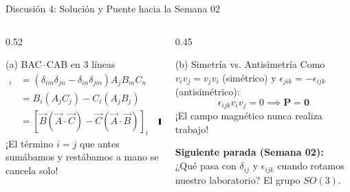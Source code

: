 \documentclass[10pt,aspectratio=169]{beamer}
\begin{document}
\begin{frame}{Discusión 4: Solución y Puente hacia la Semana 02}
  \begin{columns}[c]
    \begin{column}{0.52\textwidth}
      \begin{exampleblock}{(a) BAC--CAB en 3 líneas}
        \small
        \begin{align*}
          [\vec{A}\times(\vec{B}\times\vec{C})]_i &= (\delta_{im}\delta_{jn} - \delta_{in}\delta_{jm}) A_j B_m C_n \\
          &= B_i(A_j C_j) - C_i(A_j B_j) \\
          &= [\vec{B}(\vec{A}\cdot\vec{C}) - \vec{C}(\vec{A}\cdot\vec{B})]_i \quad \blacksquare
        \end{align*}
        ¡El término $i=j$ que antes sumábamos y restábamos a mano se cancela solo!
      \end{exampleblock}
    \end{column}
    \begin{column}{0.45\textwidth}
      \begin{block}{(b) Simetría vs. Antisimetría}
        \small
        Como $v_i v_j = v_j v_i$ (simétrico) y $\epsilon_{jik} = -\epsilon_{ijk}$ (antisimétrico):
        \[
        \epsilon_{ijk} v_i v_j = 0 \implies \mathbf{P = 0}
        \]
        ¡El campo magnético nunca realiza trabajo!
      \end{block}
      \vspace{0.1cm}
      \centering
      \textcolor{orangeacc}{\textbf{Siguiente parada (Semana 02):}}\\
      {\footnotesize ¿Qué pasa con $\delta_{ij}$ y $\epsilon_{ijk}$ cuando rotamos nuestro laboratorio? El grupo $SO(3)$.}
    \end{column}
  \end{columns}
\end{frame}
\end{document}

